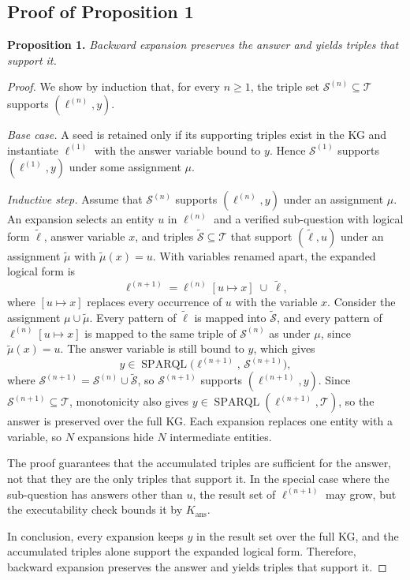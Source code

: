 \subsection{Proof of Proposition 1}
\label{app:proof1}
\textbf{Proposition 1.} \textit{Backward expansion preserves the answer and yields triples that support it.}\vspace{-2mm}
\begin{proof}
We show by induction that, for every $n\ge 1$, the triple set $\mathcal{S}^{(n)}\subseteq\mathcal{T}$ supports $(\ell^{(n)},y)$.

\textit{Base case.} A seed is retained only if its supporting triples exist in the KG and instantiate $\ell^{(1)}$ with the answer variable bound to $y$. Hence $\mathcal{S}^{(1)}$ supports $(\ell^{(1)},y)$ under some assignment $\mu$.

\textit{Inductive step.} Assume that $\mathcal{S}^{(n)}$ supports $(\ell^{(n)},y)$ under an assignment $\mu$. An expansion selects an entity $u$ in $\ell^{(n)}$ and a verified sub-question with logical form $\tilde{\ell}$, answer variable $x$, and triples $\tilde{\mathcal{S}}\subseteq\mathcal{T}$ that support $(\tilde{\ell},u)$ under an assignment $\tilde{\mu}$ with $\tilde{\mu}(x)=u$. With variables renamed apart, the expanded logical form is
\begin{equation}
    \ell^{(n+1)} = \ell^{(n)}[u\mapsto x]\;\cup\;\tilde{\ell},
\end{equation}
where $[u\mapsto x]$ replaces every occurrence of $u$ with the variable $x$. Consider the assignment $\mu\cup\tilde{\mu}$. Every pattern of $\tilde{\ell}$ is mapped into $\tilde{\mathcal{S}}$, and every pattern of $\ell^{(n)}[u\mapsto x]$ is mapped to the same triple of $\mathcal{S}^{(n)}$ as under $\mu$, since $\tilde{\mu}(x)=u$. The answer variable is still bound to $y$, which gives
\begin{equation}
    y\in\operatorname{SPARQL}\bigl(\ell^{(n+1)},\,\mathcal{S}^{(n+1)}\bigr),
\end{equation}
where $\mathcal{S}^{(n+1)}=\mathcal{S}^{(n)}\cup\tilde{\mathcal{S}}$, so $\mathcal{S}^{(n+1)}$ supports $(\ell^{(n+1)},y)$. Since $\mathcal{S}^{(n+1)}\subseteq\mathcal{T}$, monotonicity also gives $y\in\operatorname{SPARQL}(\ell^{(n+1)},\mathcal{T})$, so the answer is preserved over the full KG. Each expansion replaces one entity with a variable, so $N$ expansions hide $N$ intermediate entities.

The proof guarantees that the accumulated triples are sufficient for the answer, not that they are the only triples that support it. In the special case where the sub-question has answers other than $u$, the result set of $\ell^{(n+1)}$ may grow, but the executability check bounds it by $K_{\text{ans}}$.

In conclusion, every expansion keeps $y$ in the result set over the full KG, and the accumulated triples alone support the expanded logical form. Therefore, backward expansion preserves the answer and yields triples that support it.
\end{proof}

